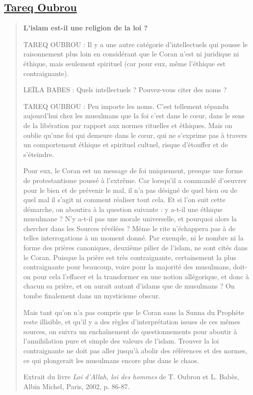 \hypertarget{tareq-oubrou}{%
\subsection{\texorpdfstring{\underline{Tareq
Oubrou}}{Tareq Oubrou}}\label{tareq-oubrou}}

\begin{quote}
\textbf{L'islam est-il une religion de la loi ?}

TAREQ OUBROU : Il y a une autre catégorie d'intellectuels qui pousse le
raisonnement plus loin en considérant que le Coran n'est ni juridique ni
éthique, mais seulement spirituel (car pour eux, même l'éthique est
contraignante).

LEÏLA BABES : Quels intellectuels ? Pouvez-vous citer des noms ?

TAREQ OUBROU : Peu importe les noms. C'est tellement répandu aujourd'hui
chez les musulmans que la foi c'est dans le cœur, dans le sens de la
libération par rapport aux normes rituelles et éthiques. Mais on oublie
qu'une foi qui demeure dans le cœur, qui ne s'exprime pas à travers un
comportement éthique et spirituel cultuel, risque d'étouffer et de
s'éteindre.

Pour eux, le Coran est un message de foi uniquement, presque une forme
de protestantisme poussé à l'extrême. Car lorsqu'il a commandé d'oeuvrer
pour le bien et de prévenir le mal, il n'a pas désigné de quel bien ou
de quel mal il s'agit ni comment réaliser tout cela. Et si l'on suit
cette démarche, on aboutira à la question suivante : y a-t-il une
éthique musulmane ? N'y a-t-il pas une morale universelle, et pourquoi
alors la chercher dans les Sources révélées ? Même le rite n'échappera
pas à de telles interrogations à un moment donné. Par exemple, ni le
nombre ni la forme des prières canoniques, deuxième pilier de l'islam,
ne sont cités dans le Coran. Puisque la prière est très contraignante,
certainement la plus contraignante pour beaucoup, voire pour la majorité
des musulmans, doit-on pour cela l'effacer et la transformer en une
notion allégorique, et donc à chacun sa prière, et on aurait autant
d'islams que de musulmans ? On tombe finalement dans un mysticisme
obscur.

Mais tant qu'on n'a pas compris que le Coran sans la Sunna du Prophète
reste illisible, et qu'il y a des règles d'interprétation issues de ces
mêmes sources, on suivra un enchaînement de questionnements pour aboutir
à l'annihilation pure et simple des valeurs de l'islam. Trouver la loi
contraignante ne doit pas aller jusqu'à abolir des références et des
normes, ce qui plongerait les musulmans encore plus dans le chaos.

Extrait du livre \emph{Loi d'Allah, loi des hommes} de T. Oubrou et L.
Babès, Albin Michel, Paris, 2002, p. 86-87.
\end{quote}

